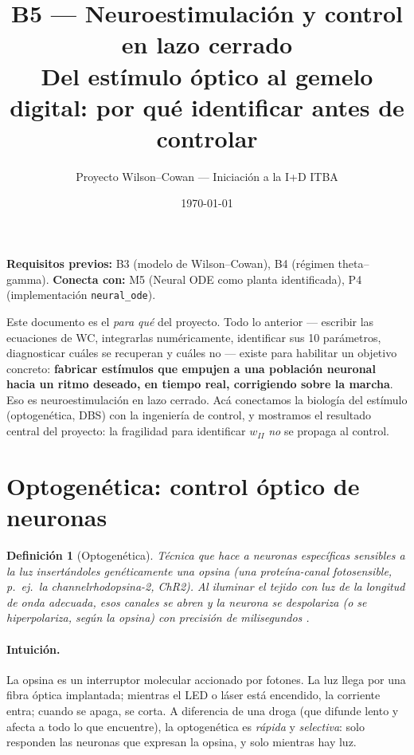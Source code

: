\documentclass[11pt,a4paper]{article}
\title{\textbf{B5 --- Neuroestimulación y control en lazo cerrado}\\[2pt]\large Del estímulo óptico al gemelo digital: por qué identificar antes de controlar}
\author{Proyecto Wilson--Cowan --- Iniciación a la I+D ITBA}
\date{\today}
\newtheorem{definition}{Definición}
\begin{document}
\maketitle
\tableofcontents
\bigskip

\noindent\textbf{Requisitos previos:} B3 (modelo de Wilson--Cowan), B4 (régimen theta--gamma). \textbf{Conecta con:} M5 (Neural ODE como planta identificada), P4 (implementación \texttt{neural\_ode}).

\bigskip
\noindent Este documento es el \emph{para qué} del proyecto. Todo lo anterior --- escribir las ecuaciones de WC, integrarlas numéricamente, identificar sus 10 parámetros, diagnosticar cuáles se recuperan y cuáles no --- existe para habilitar un objetivo concreto: \textbf{fabricar estímulos que empujen a una población neuronal hacia un ritmo deseado, en tiempo real, corrigiendo sobre la marcha}. Eso es neuroestimulación en lazo cerrado. Acá conectamos la biología del estímulo (optogenética, DBS) con la ingeniería de control, y mostramos el resultado central del proyecto: la fragilidad para identificar $w_{II}$ \emph{no} se propaga al control.

\section{Optogenética: control óptico de neuronas}

\begin{definition}[Optogenética]
Técnica que hace a neuronas específicas sensibles a la luz insertándoles genéticamente una \emph{opsina} (una proteína-canal fotosensible, p.\ ej.\ la channelrhodopsina-2, ChR2). Al iluminar el tejido con luz de la longitud de onda adecuada, esos canales se abren y la neurona se despolariza (o se hiperpolariza, según la opsina) \emph{con precisión de milisegundos} \cite{boyden2005,deisseroth2011}.
\end{definition}

\paragraph{Intuición.} La opsina es un interruptor molecular accionado por fotones. La luz llega por una fibra óptica implantada; mientras el LED o láser está encendido, la corriente entra; cuando se apaga, se corta. A diferencia de una droga (que difunde lento y afecta a todo lo que encuentre), la optogenética es \emph{rápida} y \emph{selectiva}: solo responden las neuronas que expresan la opsina, y solo mientras hay luz.
\end{document}
